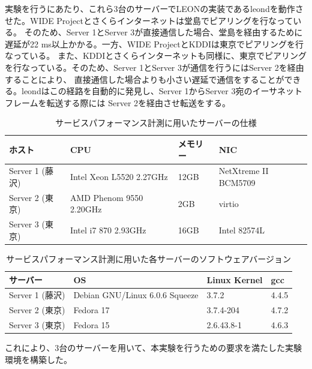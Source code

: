 実験を行うにあたり、これら3台のサーバーでLEONの実装であるleondを動作させた。WIDE Projectとさくらインターネットは堂島でピアリングを行なっている。
そのため、Server 1とServer 3が直接通信した場合、堂島を経由するために遅延が22 ms以上かかる。一方、WIDE ProjectとKDDIは東京でピアリングを行なっている。
また、KDDIとさくらインターネットも同様に、東京でピアリングを行なっている。そのため、Server 1とServer 3が通信を行うにはServer 2を経由することにより、
直接通信した場合よりも小さい遅延で通信をすることができる。leondはこの経路を自動的に発見し、Server 1からServer 3宛のイーサネットフレームを転送する際には
Server 2を経由させ転送をする。

\begin{table}[h]
\begin{center}
	\caption{サービスパフォーマンス計測に用いたサーバーの仕様}
	\begin{tabular}{|l|l|l|l|}
		\hline
		ホスト & CPU & メモリー & NIC \\
		\hline
		\hline
		Server 1 (藤沢) & Intel Xeon L5520 2.27GHz & 12GB & NetXtreme II BCM5709 \\
		\hline
		Server 2 (東京) & AMD Phenom 9550 2.20GHz& 2GB & virtio \\
		\hline
		Server 3 (東京) & Intel i7 870 2.93GHz & 16GB & Intel 82574L \\
		\hline
	\end{tabular}
	\label{table:spserv}
\end{center}
\end{table}

\begin{table}[h]
\begin{center}
	\caption{サービスパフォーマンス計測に用いた各サーバーのソフトウェアバージョン}
	\begin{tabular}{|l|l|l|l|}
		\hline
		サーバー & OS & Linux Kernel & gcc \\
		\hline
		\hline
		Server 1 (藤沢) & Debian GNU/Linux 6.0.6 Squeeze & 3.7.2 & 4.4.5 \\
		\hline
		Server 2 (東京) & Fedora 17			 & 3.7.4-204 & 4.7.2 \\
		\hline
		Server 3 (東京)	& Fedora 15			 & 2.6.43.8-1 & 4.6.3 \\
		\hline
	\end{tabular}
	\label{table:spversion}
\end{center}
\end{table}

これにより、3台のサーバーを用いて、本実験を行うための要求を満たした実験環境を構築した。


